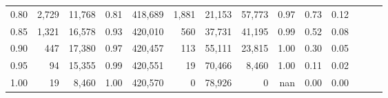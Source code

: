 \begin{tabular}{rrrrrrrrrrrrrr}
0.80 &   2,729 &  11,768 &  0.81 &  418,689 &    1,881 &  21,153 &  57,773 &  0.97 &  0.73 &      0.12 \\
0.85 &   1,321 &  16,578 &  0.93 &  420,010 &      560 &  37,731 &  41,195 &  0.99 &  0.52 &      0.08 \\
0.90 &     447 &  17,380 &  0.97 &  420,457 &      113 &  55,111 &  23,815 &  1.00 &  0.30 &      0.05 \\
0.95 &      94 &  15,355 &  0.99 &  420,551 &       19 &  70,466 &   8,460 &  1.00 &  0.11 &      0.02 \\
1.00 &      19 &   8,460 &  1.00 &  420,570 &        0 &  78,926 &       0 &   nan &  0.00 &      0.00 \\
\bottomrule
\end{tabular}

